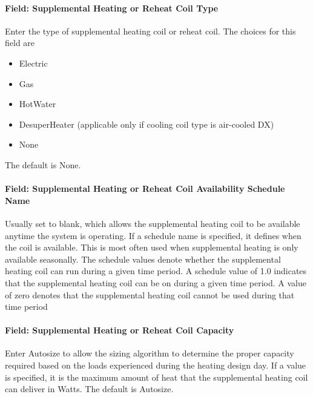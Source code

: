 \paragraph{Field: Supplemental Heating or Reheat Coil Type}\label{field-supplemental-heating-or-reheat-coil-type}

Enter the type of supplemental heating coil or reheat coil. The choices for this field are

\begin{itemize}
\item
  Electric
\item
  Gas
\item
  HotWater
\item
  DesuperHeater (applicable only if cooling coil type is air-cooled DX)
\item
  None
\end{itemize}

The default is None.

\paragraph{Field: Supplemental Heating or Reheat Coil Availability Schedule Name}\label{field-supplemental-heating-or-reheat-coil-availability-schedule-name}

Usually set to blank, which allows the supplemental heating coil to be available anytime the system is operating. If a schedule name is specified, it defines when the coil is available. This is most often used when supplemental heating is only available seasonally. The schedule values denote whether the supplemental heating coil can run during a given time period. A schedule value of 1.0 indicates that the supplemental heating coil can be on during a given time period. A value of zero denotes that the supplemental heating coil cannot be used during that time period

\paragraph{Field: Supplemental Heating or Reheat Coil Capacity}\label{field-supplemental-heating-or-reheat-coil-capacity}

Enter Autosize to allow the sizing algorithm to determine the proper capacity required based on the loads experienced during the heating design day. If a value is specified, it is the maximum amount of heat that the supplemental heating coil can deliver in Watts. The default is Autosize.

